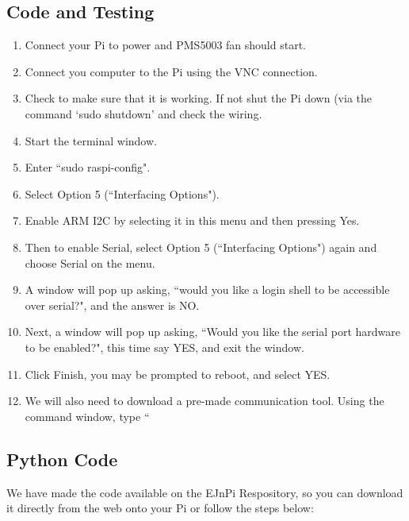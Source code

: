 \documentclass{article}
\begin{document}
\subsection{Code and Testing}

\begin{enumerate}
  \item Connect your Pi to power and PMS5003 fan should start.
  \item Connect you computer to the Pi using the VNC connection.
  \item Check to make sure that it is working. If not shut the Pi down (via the command `sudo shutdown' and check the wiring.

\item Start the terminal window.

\item Enter ``sudo raspi-config".

\item Select Option 5 (``Interfacing Options").

\item Enable ARM I2C by selecting it in this menu and then pressing Yes.

\item Then to enable Serial, select Option 5 (``Interfacing Options") again and choose Serial on the menu. 

\item A window will pop up asking, ``would you like a login shell to be accessible over serial?", and the answer is NO.

\item Next, a window will pop up asking, ``Would you like the serial port hardware to be enabled?", this time say YES, and exit the window.

\item Click Finish, you may be prompted to reboot, and select YES.

\item We will also need to download a pre-made communication tool.  Using the command window, type ``

\end{enumerate}

\subsection{Python Code}

We have made the code available on the EJnPi Respository, so you can download it directly from the web onto your Pi or follow the steps below:
\end{document}
